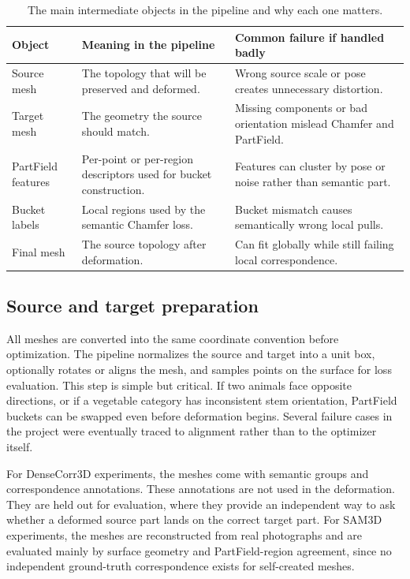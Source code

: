 \documentclass{article}
\begin{document}
\begin{table}[H]
\centering
\small
\begin{tabularx}{\textwidth}{lXX}
\toprule
Object & Meaning in the pipeline & Common failure if handled badly \\
\midrule
Source mesh & The topology that will be preserved and deformed. & Wrong source scale or pose creates unnecessary distortion. \\
Target mesh & The geometry the source should match. & Missing components or bad orientation mislead Chamfer and PartField. \\
PartField features & Per-point or per-region descriptors used for bucket construction. & Features can cluster by pose or noise rather than semantic part. \\
Bucket labels & Local regions used by the semantic Chamfer loss. & Bucket mismatch causes semantically wrong local pulls. \\
Final mesh & The source topology after deformation. & Can fit globally while still failing local correspondence. \\
\bottomrule
\end{tabularx}
\caption{The main intermediate objects in the pipeline and why each one matters.}
\label{tab:pipeline-objects}
\end{table}

\subsection{Source and target preparation}

All meshes are converted into the same coordinate convention before optimization. The pipeline
normalizes the source and target into a unit box, optionally rotates or aligns the mesh, and
samples points on the surface for loss evaluation. This step is simple but critical. If two animals
face opposite directions, or if a vegetable category has inconsistent stem orientation, PartField
buckets can be swapped even before deformation begins. Several failure cases in the project were
eventually traced to alignment rather than to the optimizer itself.

For DenseCorr3D experiments, the meshes come with semantic groups and correspondence annotations.
These annotations are not used in the deformation. They are held out for evaluation, where
they provide an independent way to ask whether a deformed source part lands on the correct target
part. For SAM3D experiments, the meshes are reconstructed from real photographs and are evaluated
mainly by surface geometry and PartField-region agreement, since no independent ground-truth
correspondence exists for self-created meshes.
\end{document}
